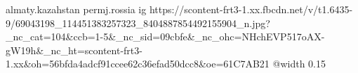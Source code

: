  
 
 
 
 

\par
almaty.kazahstan
permj.rossia
\ifcmt
  ig https://scontent-frt3-1.xx.fbcdn.net/v/t1.6435-9/69043198_114451383257323_8404887854492155904_n.jpg?_nc_cat=104&ccb=1-5&_nc_sid=09cbfe&_nc_ohc=NHchEVP517oAX-gW19h&_nc_ht=scontent-frt3-1.xx&oh=56bfda4adcf91ccee62c36efad50dcc8&oe=61C7AB21
  @width 0.15
\fi
